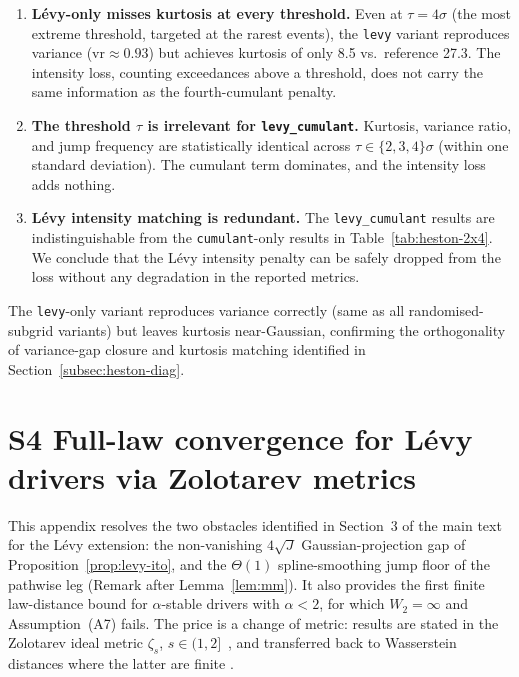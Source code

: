 \documentclass[review,12pt]{elsarticle}
\begin{document}
\begin{enumerate}
\item \textbf{L\'evy-only misses kurtosis at every threshold.}
Even at $\tau = 4\sigma$ (the most extreme threshold, targeted
at the rarest events), the \texttt{levy} variant reproduces
variance (\(\mathrm{vr} \approx 0.93\)) but achieves kurtosis
of only 8.5 vs.\ reference 27.3. The intensity loss, counting
exceedances above a threshold, does not carry the same information
as the fourth-cumulant penalty.

\item \textbf{The threshold $\tau$ is irrelevant for
\texttt{levy\_cumulant}.} Kurtosis, variance ratio, and jump
frequency are statistically identical across $\tau \in
\{2, 3, 4\}\sigma$ (within one standard deviation). The
cumulant term dominates, and the intensity loss adds nothing.

\item \textbf{L\'evy intensity matching is redundant.} The
\texttt{levy\_cumulant} results are indistinguishable from the
\texttt{cumulant}-only results in Table~\ref{tab:heston-2x4}.
We conclude that the L\'evy intensity penalty can be safely
dropped from the loss without any degradation in the reported
metrics.
\end{enumerate}

The \texttt{levy}-only variant reproduces variance correctly
(same as all randomised-subgrid variants) but leaves kurtosis
near-Gaussian, confirming the orthogonality of variance-gap
closure and kurtosis matching identified in
Section~\ref{subsec:heston-diag}.

\section*{S4 \quad Full-law convergence for L\'evy drivers via Zolotarev
metrics}
\label{app:zolotarev}

This appendix resolves the two obstacles identified in
Section~3 of the main text for the L\'evy extension: the
non-vanishing $4\sqrt J$ Gaussian-projection gap of
Proposition~\ref{prop:levy-ito}, and the $\Theta(1)$ spline-smoothing
jump floor of the pathwise leg (Remark after Lemma~\ref{lem:mm}). It
also provides the first finite law-distance bound for $\alpha$-stable
drivers with $\alpha < 2$, for which $W_2 = \infty$ and
Assumption~(A7) fails. The price is a change of metric: results are
stated in the Zolotarev ideal metric $\zeta_s$,
$s \in (1, 2]$~\cite{Zolotarev1976}, and transferred back to
Wasserstein distances where the latter are finite
\cite{Rio2009,BolbotowskiBouchitte2025}.
\end{document}
